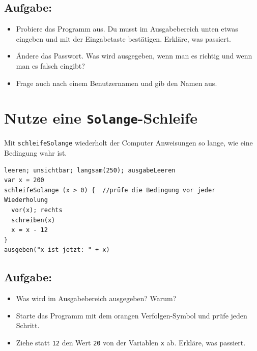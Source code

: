 \section*{\color{BrickRed}Aufgabe:}


\begin{itemize}

\item {Probiere das Programm aus. Du musst im Ausgabebereich unten etwas eingeben und mit der Eingabetaste bestätigen. Erkläre, was passiert.}
\item {Ändere das Passwort. Was wird ausgegeben, wenn man es richtig und wenn man es falsch eingibt?}
\item {Frage auch nach einem Benutzernamen und gib den Namen aus.}

\end{itemize}


\chapter{Nutze eine \lstinline{Solange}-Schleife}Mit \lstinline{schleifeSolange} wiederholt der Computer Anweisungen so lange, wie eine Bedingung wahr ist.

\begin{lstlisting}[basicstyle={\ttfamily\fontsize{22}{27}\selectfont},numbers=none]
leeren; unsichtbar; langsam(250); ausgabeLeeren
var x = 200
schleifeSolange (x > 0) {  //prüfe die Bedingung vor jeder Wiederholung 
  vor(x); rechts
  schreiben(x) 
  x = x - 12
}
ausgeben("x ist jetzt: " + x)
\end{lstlisting}
        
\section*{\color{BrickRed}Aufgabe:}


\begin{itemize}

\item {Was wird im Ausgabebereich ausgegeben? Warum?}
\item {Starte das Programm mit dem orangen Verfolgen-Symbol und prüfe jeden Schritt.}
\item {Ziehe statt \lstinline{12} den Wert \lstinline{20} von der Variablen \lstinline{x} ab. Erkläre, was passiert.}

\end{itemize}


